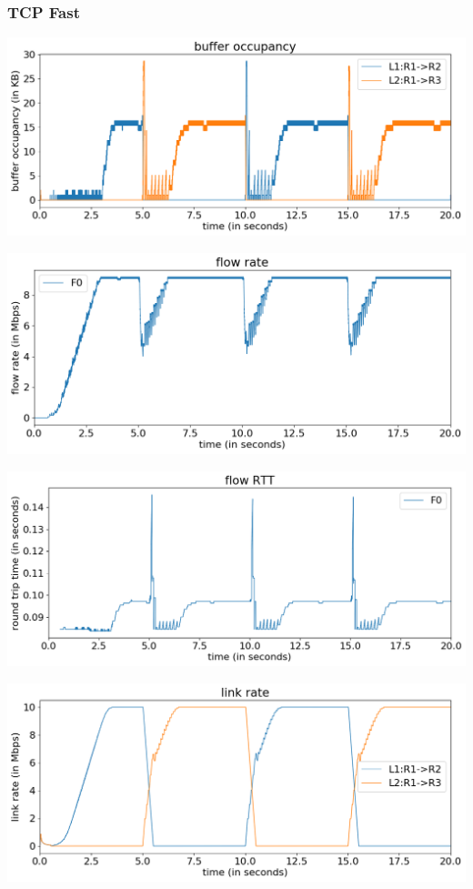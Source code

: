 \documentclass{article}
\begin{document}
\subsubsection{TCP Fast}

\includegraphics[width = \textwidth]{"test_case1_fast buffer occupancy"}

\includegraphics[width = \textwidth]{"test_case1_fast flow rate"}

\includegraphics[width = \textwidth]{"test_case1_fast flow RTT"}

\includegraphics[width = \textwidth]{"test_case1_fast link rate"}
\end{document}
